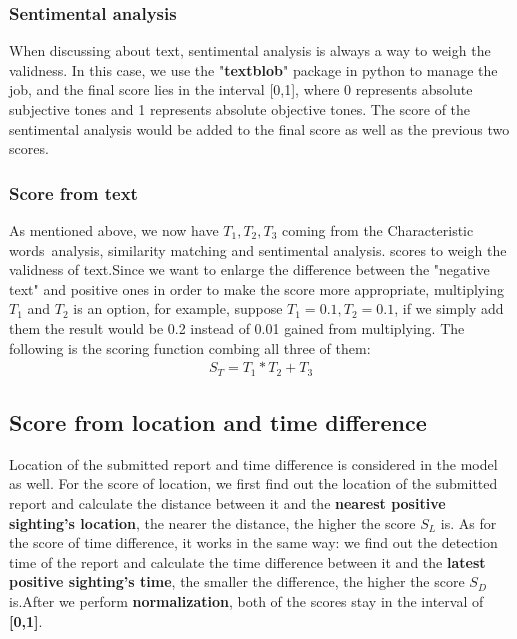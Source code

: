 \documentclass{mcmthesis}
\begin{document}
	\subsubsection{Sentimental analysis}
	\quad When discussing about text, sentimental analysis is always a way to weigh the validness. In this case, we use the "\textbf{textblob}" package in python to manage the job, and the final score lies in the interval [0,1], where 0 represents absolute subjective tones and 1 represents absolute objective tones. The score of the sentimental analysis would be added to the final score as well as the previous two scores.
	\subsubsection{Score from text}
	\quad As mentioned above, we now have $T_1,T_2,T_3$ coming from the  Characteristic words analysis, similarity matching and sentimental analysis. scores to weigh the validness of text.Since we want to enlarge the difference between the "negative text" and positive ones in order to make the score more appropriate, multiplying $T_1$ and $T_2$ is an option, for example, suppose $T_1 = 0.1,T_2=0.1$, if we simply add them the result would be 0.2 instead of 0.01 gained from multiplying. The following is the scoring function combing all three of them:
	\begin{align*}
		S_T = T_1*T_2+T_3
	\end{align*}
    \subsection{Score from location and time difference}
    \quad Location of the submitted report and time difference is considered in the model as well. For the score of location, we first find out the location of the submitted report and calculate the distance between it and the \textbf{nearest positive sighting's location}, the nearer the distance, the higher the score $S_L$ is. As for the score of time difference, it works in the same way: we find out the detection time of the report and calculate the time difference between it and the \textbf{latest positive sighting's time}, the smaller the difference, the higher the score $S_D$ is.After we perform \textbf{normalization}, both of the scores stay in the interval of \textbf{[0,1]}.
\end{document}
